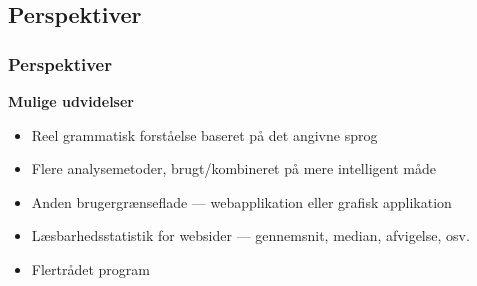 \documentclass{beamer}
\begin{document}
\subsection{Perspektiver}
\begin{frame}
  \frametitle{Perspektiver}

  \textbf{Mulige udvidelser}

  \begin{itemize}
  \item<1-> Reel grammatisk forståelse baseret på det angivne sprog
  \item<2-> Flere analysemetoder, brugt/kombineret på mere intelligent måde
  \item<3-> Anden brugergrænseflade --- webapplikation eller grafisk applikation
  \item<4-> Læsbarhedsstatistik for websider --- gennemsnit, median, afvigelse, osv.
  \item<5-> Flertrådet program
  \end{itemize}
\end{frame}
\end{document}
